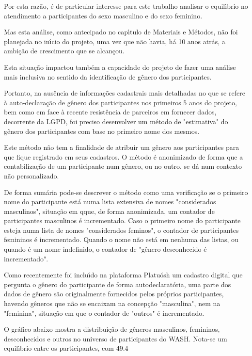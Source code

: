 \documentclass[
12pt,		%
openright,	%
twoside,  %
a4paper,			%
chapter=TITLE,		%
english,			%
french,				%
spanish,			%
brazil				%
]{USPSC-classe/USPSC}
\begin{document}
Por esta raz\~ao, \'e de particular interesse para este trabalho analisar o equil\'{\i}brio no atendimento a participantes do sexo masculino e do sexo feminino.


Mas esta an\'alise, como antecipado no cap\'{\i}tulo de Materiais e M\'etodos, n\~ao foi planejada no in\'{\i}cio do projeto, uma vez que n\~ao havia, h\'a 10 anos atr\'as, a ambi\c{c}\~ao de crescimento que se alcan\c{c}ou.


Esta situa\c{c}\~ao impactou tamb\'em a capacidade do projeto de fazer uma an\'alise mais inclusiva no sentido da identifica\c{c}\~ao de g\^enero dos participantes.


Portanto, na aus\^encia de informa\c{c}\~oes cadastrais mais detalhadas no que se refere \`a auto-declara\c{c}\~ao de g\^enero dos participantes nos primeiros 5 anos do projeto, bem como em face \`a recente resist\^encia de parceiros em fornecer dados, decorrente da LGPD, foi preciso desenvolver um m\'etodo de "estimativa" do g\^enero dos participantes com base no primeiro nome dos mesmos.


Este m\'etodo n\~ao tem a finalidade de atribuir um g\^enero aos participantes para que fique registrado em seus cadastros. O m\'etodo \'e anonimizado de forma que a contabiliza\c{c}\~ao de um participante num g\^enero, ou no outro, se d\'a num contexto n\~ao personalizado.


De forma sum\'aria pode-se descrever o m\'etodo como uma verifica\c{c}\~ao se o primeiro nome do participante est\'a numa lista extensiva de nomes "considerados masculinos", situa\c{c}\~ao em qque, de forma anonimizada, um contador de participantes masculinos \'e incrementado. Caso o primeiro nome do participante esteja numa lista de nomes "considerados feminos", o contador de participantes femininos \'e incrementado. Quando o nome n\~ao est\'a em nenhuma das listas, ou quando \'e um nome indefinido, o contador de "g\^enero desconhecido \'e incrementado".


Como recentemente foi inclu\'{\i}do na plataforma Platu\'osh um cadastro digital que pergunta o g\^enero do participante de forma autodeclarat\'oria, uma parte dos dados de g\^enero s\~ao originalmente fornecidos pelos pr\'oprios participantes, havendo g\^eneros que n\~ao se encaixam na concep\c{c}\~ao "masculina", nem na "feminina", situa\c{c}\~ao em que o contador de "outros" \'e incrementado.


O gr\'afico abaixo mostra a distribui\c{c}\~ao de g\^eneros masculinos, femininos, desconhecidos e outros no universo de participantes do WASH. Nota-se um equil\'{\i}brio entre os participantes, com 49.4%
\end{document}
